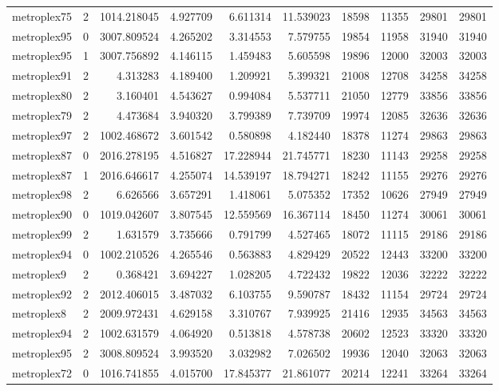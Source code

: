 \begin{longtable}{|l|r|r|r|r|r|r|r|r|r|}
metroplex75 & 2 & 1014.218045 & 4.927709 & 6.611314 & 11.539023 & 18598 & 11355 & 29801 & 29801 \\
metroplex95 & 0 & 3007.809524 & 4.265202 & 3.314553 & 7.579755 & 19854 & 11958 & 31940 & 31940 \\
metroplex95 & 1 & 3007.756892 & 4.146115 & 1.459483 & 5.605598 & 19896 & 12000 & 32003 & 32003 \\
metroplex91 & 2 & 4.313283 & 4.189400 & 1.209921 & 5.399321 & 21008 & 12708 & 34258 & 34258 \\
metroplex80 & 2 & 3.160401 & 4.543627 & 0.994084 & 5.537711 & 21050 & 12779 & 33856 & 33856 \\
metroplex79 & 2 & 4.473684 & 3.940320 & 3.799389 & 7.739709 & 19974 & 12085 & 32636 & 32636 \\
metroplex97 & 2 & 1002.468672 & 3.601542 & 0.580898 & 4.182440 & 18378 & 11274 & 29863 & 29863 \\
metroplex87 & 0 & 2016.278195 & 4.516827 & 17.228944 & 21.745771 & 18230 & 11143 & 29258 & 29258 \\
metroplex87 & 1 & 2016.646617 & 4.255074 & 14.539197 & 18.794271 & 18242 & 11155 & 29276 & 29276 \\
metroplex98 & 2 & 6.626566 & 3.657291 & 1.418061 & 5.075352 & 17352 & 10626 & 27949 & 27949 \\
metroplex90 & 0 & 1019.042607 & 3.807545 & 12.559569 & 16.367114 & 18450 & 11274 & 30061 & 30061 \\
metroplex99 & 2 & 1.631579 & 3.735666 & 0.791799 & 4.527465 & 18072 & 11115 & 29186 & 29186 \\
metroplex94 & 0 & 1002.210526 & 4.265546 & 0.563883 & 4.829429 & 20522 & 12443 & 33200 & 33200 \\
metroplex9 & 2 & 0.368421 & 3.694227 & 1.028205 & 4.722432 & 19822 & 12036 & 32222 & 32222 \\
metroplex92 & 2 & 2012.406015 & 3.487032 & 6.103755 & 9.590787 & 18432 & 11154 & 29724 & 29724 \\
metroplex8 & 2 & 2009.972431 & 4.629158 & 3.310767 & 7.939925 & 21416 & 12935 & 34563 & 34563 \\
metroplex94 & 2 & 1002.631579 & 4.064920 & 0.513818 & 4.578738 & 20602 & 12523 & 33320 & 33320 \\
metroplex95 & 2 & 3008.809524 & 3.993520 & 3.032982 & 7.026502 & 19936 & 12040 & 32063 & 32063 \\
metroplex72 & 0 & 1016.741855 & 4.015700 & 17.845377 & 21.861077 & 20214 & 12241 & 33264 & 33264 \\

\end{longtable}
